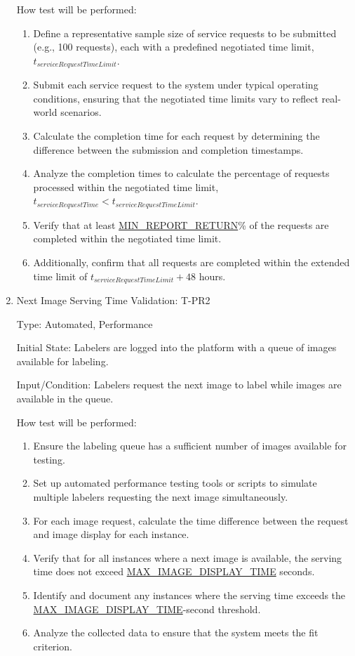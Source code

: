 \documentclass[12pt, titlepage]{article}
\begin{document}
\begin{enumerate}
How test will be performed:
\begin{enumerate}
    \item Define a representative sample size of service requests to be submitted (e.g., 100 requests), each with a predefined negotiated time limit, $t_{serviceRequestTimeLimit}$.
    \item Submit each service request to the system under typical operating conditions, ensuring that the negotiated time limits vary to reflect real-world scenarios.
    \item Calculate the completion time for each request by determining the difference between the submission and completion timestamps.
    \item Analyze the completion times to calculate the percentage of requests processed within the negotiated time limit, $t_{serviceRequestTime} < t_{serviceRequestTimeLimit}$.
    \item Verify that at least \hyperref[MIN_REPORT_RETURN]{MIN\_REPORT\_RETURN}\% of the requests are completed within the negotiated time limit.
    \item Additionally, confirm that all requests are completed within the extended time limit of $t_{serviceRequestTimeLimit} + 48$ hours.
\end{enumerate}

\item{Next Image Serving Time Validation: T-PR2\\}

Type: Automated, Performance

Initial State: Labelers are logged into the platform with a queue of images available for labeling.

Input/Condition: Labelers request the next image to label while images are available in the queue.

How test will be performed:
\begin{enumerate}
    \item Ensure the labeling queue has a sufficient number of images available for testing.
    \item Set up automated performance testing tools or scripts to simulate multiple labelers requesting the next image simultaneously.
    \item For each image request, calculate the time difference between the request and image display for each instance.
    \item Verify that for all instances where a next image is available, the serving time does not exceed \hyperref[MAX_IMAGE_DISPLAY_TIME]{MAX\_IMAGE\_DISPLAY\_TIME} seconds.
    \item Identify and document any instances where the serving time exceeds the \hyperref[MAX_IMAGE_DISPLAY_TIME]{MAX\_IMAGE\_DISPLAY\_TIME}-second threshold.
    \item Analyze the collected data to ensure that the system meets the fit criterion.
\end{enumerate}


\end{enumerate}
\end{document}
